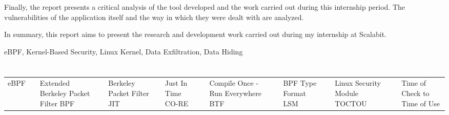 \documentclass[11pt,twoside]{estiloUBI}
\begin{document}
Finally, the report presents a critical analysis of the tool developed and the work carried out during this internship period. The vulnerabilities of the application itself and the way in which they were dealt with are analyzed.

In summary, this report aims to present the research and development work carried out during my internship at Scalabit.


\vspace{2.2cm}
{}
\vspace{0.8cm}

eBPF, Kernel-Based Security, Linux Kernel, Data Exfiltration, Data Hiding
\cleardoublepage


\tableofcontents





\listoffigures
\cleardoublepage
%
%


\newpage
\section*{}
\vspace{0.5cm}
\begin{tabularx}{\linewidth}{c p{0.5cm} Y}
	eBPF   &  & Extended Berkeley Packet Filter\cr
	BPF    &  & Berkeley Packet Filter\cr
	JIT    &  & Just In Time\cr
	CO-RE  &  & Compile Once - Run Everywhere\cr
	BTF    &  & BPF Type Format\cr
	LSM    &  & Linux Security Module\cr
	TOCTOU &  & Time of Check to Time of Use\cr
\end{tabularx}
\cleardoublepage



\mainmatter













\cleardoublepage
{}
{}
%
%
%
\end{document}
